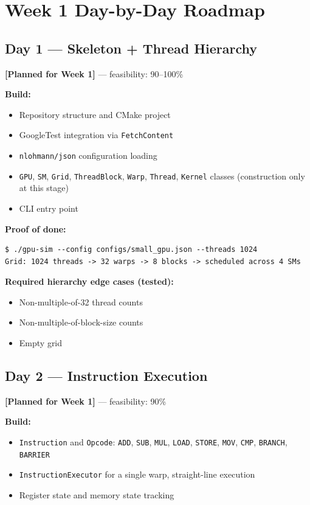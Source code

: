 \documentclass[11pt]{article}
\newcommand{\statuslabel}[1]{\textbf{\textcolor{steel}{[#1]}}}
\begin{document}
\section{Week 1 Day-by-Day Roadmap}

\subsection{Day 1 --- Skeleton + Thread Hierarchy}
\statuslabel{Planned for Week 1} --- feasibility: 90--100\%

\textbf{Build:}
\begin{itemize}[leftmargin=1.2cm]
  \item Repository structure and CMake project
  \item GoogleTest integration via \texttt{FetchContent}
  \item \texttt{nlohmann/json} configuration loading
  \item \texttt{GPU}, \texttt{SM}, \texttt{Grid}, \texttt{ThreadBlock},
  \texttt{Warp}, \texttt{Thread}, \texttt{Kernel} classes (construction
  only at this stage)
  \item CLI entry point
\end{itemize}

\textbf{Proof of done:}
\begin{lstlisting}
$ ./gpu-sim --config configs/small_gpu.json --threads 1024
Grid: 1024 threads -> 32 warps -> 8 blocks -> scheduled across 4 SMs
\end{lstlisting}

\textbf{Required hierarchy edge cases (tested):}
\begin{itemize}[leftmargin=1.2cm]
  \item Non-multiple-of-32 thread counts
  \item Non-multiple-of-block-size counts
  \item Empty grid
\end{itemize}

\subsection{Day 2 --- Instruction Execution}
\statuslabel{Planned for Week 1} --- feasibility: 90\%

\textbf{Build:}
\begin{itemize}[leftmargin=1.2cm]
  \item \texttt{Instruction} and \texttt{Opcode}: \texttt{ADD}, \texttt{SUB},
  \texttt{MUL}, \texttt{LOAD}, \texttt{STORE}, \texttt{MOV}, \texttt{CMP},
  \texttt{BRANCH}, \texttt{BARRIER}
  \item \texttt{InstructionExecutor} for a single warp, straight-line
  execution
  \item Register state and memory state tracking
\end{itemize}
\end{document}
